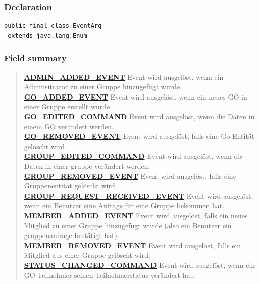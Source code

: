 \documentclass[11pt,a4paper]{report}
\begin{document}
{{{{{{{{{{{{{{{\subsubsection{Declaration}{
\begin{lstlisting}[frame=none]
public final class EventArg
 extends java.lang.Enum\end{lstlisting}
\subsubsection{Field summary}{
\begin{verse}
\hyperlink{edu.kit.pse17.go_app.ClientCommunication.Downstream.EventArg.ADMIN_ADDED_EVENT}{{\bf ADMIN\_ADDED\_EVENT}} Event wird ausgelöst, wenn ein Adminsitrator zu einer Gruppe hinzugefügt wurde.\\
\hyperlink{edu.kit.pse17.go_app.ClientCommunication.Downstream.EventArg.GO_ADDED_EVENT}{{\bf GO\_ADDED\_EVENT}} Event wird ausgelöst, wenn ein neues GO in einer Gruppe erstellt wurde.\\
\hyperlink{edu.kit.pse17.go_app.ClientCommunication.Downstream.EventArg.GO_EDITED_COMMAND}{{\bf GO\_EDITED\_COMMAND}} Event wird ausgelöst, wenn die Daten in einem GO verändert werden.\\
\hyperlink{edu.kit.pse17.go_app.ClientCommunication.Downstream.EventArg.GO_REMOVED_EVENT}{{\bf GO\_REMOVED\_EVENT}} Event wird ausgelöst, falls eine Go-Entität gelöscht wird.\\
\hyperlink{edu.kit.pse17.go_app.ClientCommunication.Downstream.EventArg.GROUP_EDITED_COMMAND}{{\bf GROUP\_EDITED\_COMMAND}} Event wird ausgelöst, wenn die Daten in einer gruppe verändert werden.\\
\hyperlink{edu.kit.pse17.go_app.ClientCommunication.Downstream.EventArg.GROUP_REMOVED_EVENT}{{\bf GROUP\_REMOVED\_EVENT}} Event wird ausgelöst, falls eine Gruppenentität gelöscht wird.\\
\hyperlink{edu.kit.pse17.go_app.ClientCommunication.Downstream.EventArg.GROUP_REQUEST_RECEIVED_EVENT}{{\bf GROUP\_REQUEST\_RECEIVED\_EVENT}} Event wird ausgelöst, wenn ein Benutzer eine Anfrage für eine Gruppe bekommen hat.\\
\hyperlink{edu.kit.pse17.go_app.ClientCommunication.Downstream.EventArg.MEMBER_ADDED_EVENT}{{\bf MEMBER\_ADDED\_EVENT}} Event wird ausgelöst, falls ein neues Mitglied zu einer Gruppe hinzugefügt wurde (also ein Benutzer ein gruppenanfrage bestätigt hat).\\
\hyperlink{edu.kit.pse17.go_app.ClientCommunication.Downstream.EventArg.MEMBER_REMOVED_EVENT}{{\bf MEMBER\_REMOVED\_EVENT}} Event wird ausgelöst, falls ein Mitglied aus einer Gruppe gelöscht wird.\\
\hyperlink{edu.kit.pse17.go_app.ClientCommunication.Downstream.EventArg.STATUS_CHANGED_COMMAND}{{\bf STATUS\_CHANGED\_COMMAND}} Event wird ausgelöst, wenn ein GO-Teilnehmer seinen Teilnehmerstatus verändert hat.\\
\end{verse}
}
}}}}}}}}}}}}}}}}
\end{document}
